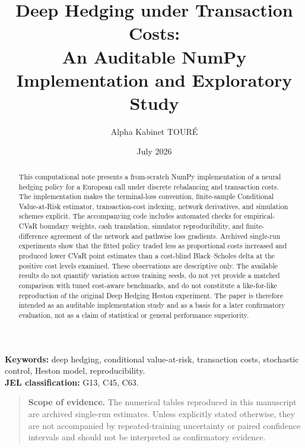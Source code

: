 \documentclass[11pt]{article}
\title{\textbf{Deep Hedging under Transaction Costs:\\
An Auditable NumPy Implementation and Exploratory Study}}
\author[1]{Alpha Kabinet TOUR\'{E}}
\affil[1]{Alpha Stochastic Research}
\date{July 2026}
\newcommand{\1}{\mathbf{1}}
\begin{document}
\maketitle

\begin{abstract}
This computational note presents a from-scratch NumPy implementation of a
neural hedging policy for a European call under discrete rebalancing and
transaction costs. The implementation makes the terminal-loss convention,
finite-sample Conditional Value-at-Risk estimator, transaction-cost indexing,
network derivatives, and simulation schemes explicit. The accompanying code
includes automated checks for empirical-CVaR boundary weights, cash
translation, simulator reproducibility, and finite-difference agreement of the
network and pathwise loss gradients. Archived single-run experiments show that
the fitted policy traded less as proportional costs increased and produced
lower CVaR point estimates than a cost-blind Black--Scholes delta at the
positive cost levels examined. These observations are descriptive only. The
available results do not quantify variation across training seeds, do not yet
provide a matched comparison with tuned cost-aware benchmarks, and do not
constitute a like-for-like reproduction of the original Deep Hedging Heston
experiment. The paper is therefore intended as an auditable implementation
study and as a basis for a later confirmatory evaluation, not as a claim of
statistical or general performance superiority.
\end{abstract}

\noindent\textbf{Keywords:} deep hedging, conditional value-at-risk,
transaction costs, stochastic control, Heston model, reproducibility.\\
\noindent\textbf{JEL classification:} G13, C45, C63.

\begin{quote}
\small
\textbf{Scope of evidence.} The numerical tables reproduced in this manuscript
are archived single-run estimates. Unless explicitly stated otherwise, they
are not accompanied by repeated-training uncertainty or paired confidence
intervals and should not be interpreted as confirmatory evidence.
\end{quote}














\appendix

\end{document}
